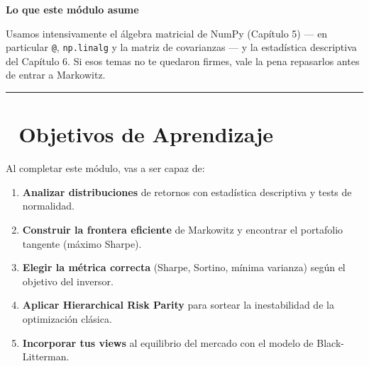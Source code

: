 \documentclass[
  spanish,
  letterpaper,
  DIV=11,
  numbers=noendperiod]{scrreprt}
\providecommand{\tightlist}{%
  \setlength{\itemsep}{0pt}\setlength{\parskip}{0pt}}
\begin{document}
\begin{tcolorbox}[enhanced jigsaw, bottomrule=.15mm, colback=white, breakable, left=2mm, colframe=quarto-callout-note-color-frame, leftrule=.75mm, arc=.35mm, toprule=.15mm, rightrule=.15mm, opacityback=0]
\begin{minipage}[t]{5.5mm}
\textcolor{quarto-callout-note-color}{\faInfo}
\end{minipage}%
\begin{minipage}[t]{\textwidth - 5.5mm}

\vspace{-3mm}\textbf{Lo que este módulo asume}\vspace{3mm}

Usamos intensivamente el álgebra matricial de NumPy (Capítulo 5) --- en
particular \texttt{@}, \texttt{np.linalg} y la matriz de covarianzas ---
y la estadística descriptiva del Capítulo 6. Si esos temas no te
quedaron firmes, vale la pena repasarlos antes de entrar a Markowitz.

\end{minipage}%
\end{tcolorbox}

\begin{center}\rule{0.5\linewidth}{0.5pt}\end{center}

\section*{🎯 Objetivos de Aprendizaje}\label{objetivos-de-aprendizaje-1}


Al completar este módulo, vas a ser capaz de:

\begin{enumerate}
\def\labelenumi{\arabic{enumi}.}
\tightlist
\item
  \textbf{Analizar distribuciones} de retornos con estadística
  descriptiva y tests de normalidad.
\item
  \textbf{Construir la frontera eficiente} de Markowitz y encontrar el
  portafolio tangente (máximo Sharpe).
\item
  \textbf{Elegir la métrica correcta} (Sharpe, Sortino, mínima varianza)
  según el objetivo del inversor.
\item
  \textbf{Aplicar Hierarchical Risk Parity} para sortear la
  inestabilidad de la optimización clásica.
\item
  \textbf{Incorporar tus views} al equilibrio del mercado con el modelo
  de Black-Litterman.
\end{enumerate}
\end{document}
